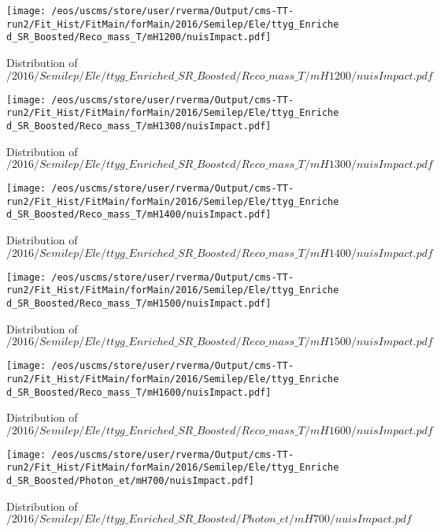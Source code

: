 \begin{figure}
\centering
\texttt{[image: /eos/uscms/store/user/rverma/Output/cms-TT-run2/Fit\_Hist/FitMain/forMain/2016/Semilep/Ele/ttyg\_Enriched\_SR\_Boosted/Reco\_mass\_T/mH1200/nuisImpact.pdf]}
\caption{Distribution of $/2016/Semilep/Ele/ttyg\_Enriched\_SR\_Boosted/Reco\_mass\_T/mH1200/nuisImpact.pdf$}
\end{figure}

\begin{figure}
\centering
\texttt{[image: /eos/uscms/store/user/rverma/Output/cms-TT-run2/Fit\_Hist/FitMain/forMain/2016/Semilep/Ele/ttyg\_Enriched\_SR\_Boosted/Reco\_mass\_T/mH1300/nuisImpact.pdf]}
\caption{Distribution of $/2016/Semilep/Ele/ttyg\_Enriched\_SR\_Boosted/Reco\_mass\_T/mH1300/nuisImpact.pdf$}
\end{figure}

\begin{figure}
\centering
\texttt{[image: /eos/uscms/store/user/rverma/Output/cms-TT-run2/Fit\_Hist/FitMain/forMain/2016/Semilep/Ele/ttyg\_Enriched\_SR\_Boosted/Reco\_mass\_T/mH1400/nuisImpact.pdf]}
\caption{Distribution of $/2016/Semilep/Ele/ttyg\_Enriched\_SR\_Boosted/Reco\_mass\_T/mH1400/nuisImpact.pdf$}
\end{figure}

\begin{figure}
\centering
\texttt{[image: /eos/uscms/store/user/rverma/Output/cms-TT-run2/Fit\_Hist/FitMain/forMain/2016/Semilep/Ele/ttyg\_Enriched\_SR\_Boosted/Reco\_mass\_T/mH1500/nuisImpact.pdf]}
\caption{Distribution of $/2016/Semilep/Ele/ttyg\_Enriched\_SR\_Boosted/Reco\_mass\_T/mH1500/nuisImpact.pdf$}
\end{figure}

\begin{figure}
\centering
\texttt{[image: /eos/uscms/store/user/rverma/Output/cms-TT-run2/Fit\_Hist/FitMain/forMain/2016/Semilep/Ele/ttyg\_Enriched\_SR\_Boosted/Reco\_mass\_T/mH1600/nuisImpact.pdf]}
\caption{Distribution of $/2016/Semilep/Ele/ttyg\_Enriched\_SR\_Boosted/Reco\_mass\_T/mH1600/nuisImpact.pdf$}
\end{figure}

\begin{figure}
\centering
\texttt{[image: /eos/uscms/store/user/rverma/Output/cms-TT-run2/Fit\_Hist/FitMain/forMain/2016/Semilep/Ele/ttyg\_Enriched\_SR\_Boosted/Photon\_et/mH700/nuisImpact.pdf]}
\caption{Distribution of $/2016/Semilep/Ele/ttyg\_Enriched\_SR\_Boosted/Photon\_et/mH700/nuisImpact.pdf$}
\end{figure}


